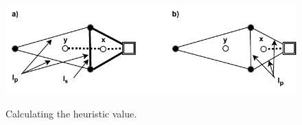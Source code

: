 \begin{figure}[h]
	\begin{centering}
		{\includegraphics[scale=0.9]{figures/approach/heuristic.pdf}}
		\caption[Heuristic value]{Calculating the heuristic value.}
		\label{fig:heuristic}
	\end{centering}
\end{figure}
